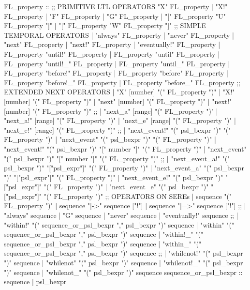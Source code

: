 \begin{Grammar}
FL_property ::
 ;; PRIMITIVE LTL OPERATORS
   "X" FL_property                      
 | "X!" FL_property                     
 | "F" FL_property                      
 | "G" FL_property                      
 | "[" FL_property "U" FL_property "]"  
 | "[" FL_property "W" FL_property "]"  
 ;; SIMPLE TEMPORAL OPERATORS
 | "always" FL_property                 
 | "never" FL_property                  
 | "next" FL_property                   
 | "next!" FL_property                  
 | "eventually!" FL_property            
 | FL_property "until!" FL_property     
 | FL_property "until" FL_property      
 | FL_property "until!_" FL_property                                     
 | FL_property "until_" FL_property     
 | FL_property "before!" FL_property    
 | FL_property "before" FL_property     
 | FL_property "before!_" FL_property   
 | FL_property "before_" FL_property    
 ;; EXTENDED NEXT OPERATORS
 | "X" [number] "(" FL_property ")"
 | "X!" [number] "(" FL_property ")"                     
 | "next" [number] "(" FL_property ")"                   
 | "next!" [number] "(" FL_property ")"                  
 ;;
 | "next_a" [range] "(" FL_property ")"
 | "next_a!" [range] "(" FL_property ")"
 | "next_e" [range] "(" FL_property ")"
 | "next_e!" [range] "(" FL_property ")"
 ;;
 | "next_event!" "(" psl_bexpr ")" "(" FL_property ")"
 | "next_event" "(" psl_bexpr ")" "(" FL_property ")"
 | "next_event!" "(" psl_bexpr ")" "[" number "]"  "(" FL_property ")"
 | "next_event" "(" psl_bexpr ")" "[" number "]"  "(" FL_property ")"
 ;;
 | "next_event_a!" "(" psl_bexpr ")" "["psl_expr"]"  "(" FL_property ")"
 | "next_event_a" "(" psl_bexpr ")" "["psl_expr"]"  "(" FL_property ")"
 | "next_event_e!" "(" psl_bexpr ")" "["psl_expr"]"  "(" FL_property ")"
 | "next_event_e" "(" psl_bexpr ")" "["psl_expr"]"  "(" FL_property ")"
 ;; OPERATORS ON SEREs
 | sequence "(" FL_property ")"
 | sequence "|->" sequence ["!"]
 | sequence "|=>" sequence ["!"]
 ;;
 | "always" sequence
 | "G" sequence
 | "never" sequence
 | "eventually!" sequence
 ;;
 | "within!" "(" sequence_or_psl_bexpr "," psl_bexpr ")" sequence
 | "within" "(" sequence_or_psl_bexpr "," psl_bexpr ")" sequence
 | "within!_" "(" sequence_or_psl_bexpr "," psl_bexpr ")" sequence
 | "within_" "(" sequence_or_psl_bexpr "," psl_bexpr ")" sequence
 ;;
 | "whilenot!" "(" psl_bexpr ")" sequence
 | "whilenot" "(" psl_bexpr ")" sequence
 | "whilenot!_" "(" psl_bexpr ")" sequence
 | "whilenot_" "(" psl_bexpr ")" sequence
sequence_or_psl_bexpr ::
   sequence
 | psl_bexpr
\end{Grammar}
